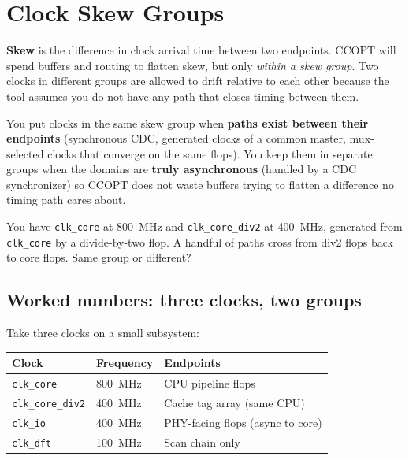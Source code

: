 \section{Clock Skew Groups}

\textbf{Skew} is the difference in clock arrival time between two endpoints. CCOPT will spend buffers and routing to flatten skew, but only \emph{within a skew group}. Two clocks in different groups are allowed to drift relative to each other because the tool assumes you do not have any path that closes timing between them.

You put clocks in the same skew group when \textbf{paths exist between their endpoints} (synchronous CDC, generated clocks of a common master, mux-selected clocks that converge on the same flops). You keep them in separate groups when the domains are \textbf{truly asynchronous} (handled by a CDC synchronizer) so CCOPT does not waste buffers trying to flatten a difference no timing path cares about.

\begin{gut}
You have \texttt{clk\_core} at 800~MHz and \texttt{clk\_core\_div2} at 400~MHz, generated from \texttt{clk\_core} by a divide-by-two flop. A handful of paths cross from div2 flops back to core flops. Same group or different?
\end{gut}

\subsection*{Worked numbers: three clocks, two groups}

Take three clocks on a small subsystem:

\begin{center}
\begin{tabular}{lll}
\textbf{Clock} & \textbf{Frequency} & \textbf{Endpoints} \\
\hline
\texttt{clk\_core}      & 800~MHz & CPU pipeline flops \\
\texttt{clk\_core\_div2} & 400~MHz & Cache tag array (same CPU) \\
\texttt{clk\_io}        & 400~MHz & PHY-facing flops (async to core) \\
\texttt{clk\_dft}       & 100~MHz & Scan chain only \\
\end{tabular}
\end{center}

